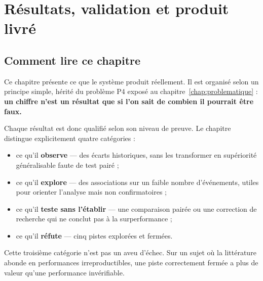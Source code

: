 %

\chapter{Résultats, validation et produit livré}
\label{chap:resultats}

\section*{Comment lire ce chapitre}

Ce chapitre présente ce que le système produit réellement. Il est organisé selon
un principe simple, hérité du problème P4 exposé au
chapitre~\ref{chap:problematique} : \textbf{un chiffre n'est un résultat que si
l'on sait de combien il pourrait être faux.}

Chaque résultat est donc qualifié selon son niveau de preuve. Le chapitre
distingue explicitement quatre catégories :

\begin{itemize}
  \item ce qu'il \textbf{observe} — des écarts historiques, sans les transformer
        en supériorité généralisable faute de test pairé ;
  \item ce qu'il \textbf{explore} — des associations sur un faible nombre
        d'événements, utiles pour orienter l'analyse mais non confirmatoires ;
  \item ce qu'il \textbf{teste sans l'établir} — une comparaison pairée ou une
        correction de recherche qui ne conclut pas à la surperformance ;
  \item ce qu'il \textbf{réfute} — cinq pistes explorées et fermées.
\end{itemize}

Cette troisième catégorie n'est pas un aveu d'échec. Sur un sujet où la
littérature abonde en performances irreproductibles, une piste correctement
fermée a plus de valeur qu'une performance invérifiable.

